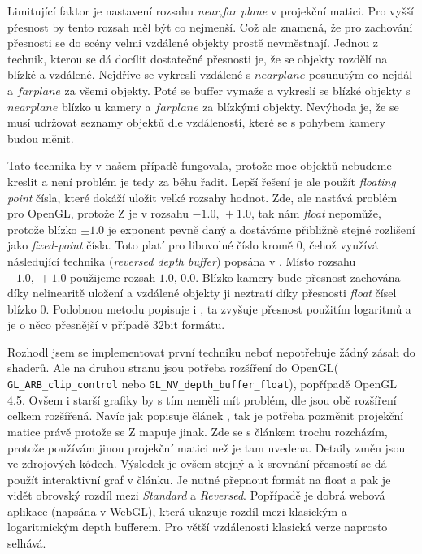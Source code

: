 Limitující faktor je nastavení rozsahu \textit{near,far plane} v projekční matici. Pro vyšší přesnost by tento rozsah měl být co nejmenší. Což ale znamená, že pro zachování přesnosti se do scény velmi vzdálené objekty prostě nevměstnají. Jednou z technik, kterou se dá docílit dostatečné přesnosti je, že se objekty rozdělí na blízké a vzdálené. Nejdříve se vykreslí vzdálené s $ near plane $ posunutým co nejdál a $ far plane $ za všemi objekty. Poté se buffer vymaže a vykreslí se blízké objekty s $ near plane $ blízko u kamery a $ far plane $ za blízkými objekty. Nevýhoda je, že se musí udržovat seznamy objektů dle vzdáleností, které se s pohybem kamery budou měnit. 

Tato technika by v našem případě fungovala, protože moc objektů nebudeme kreslit a není problém je tedy za běhu řadit. Lepší řešení je ale použít \textit{floating point} čísla, které dokáží uložit velké rozsahy hodnot. Zde, ale nastává problém pro OpenGL, protože Z je v rozsahu $ -1.0,\,+1.0 $, tak nám \textit{float} nepomůže, protože blízko $ \pm1.0 $ je exponent pevně daný a dostáváme přibližně stejné rozlišení jako \textit{fixed-point} čísla. Toto platí pro libovolné číslo kromě 0, čehož využívá následující technika (\textit{reversed depth buffer}) popsána v \cite{revBuff}. Místo rozsahu $ -1.0,\,+1.0 $ použijeme rozsah  $ 1.0,\,0.0  $. Blízko kamery bude přesnost zachována díky nelinearitě uložení a vzdálené objekty ji neztratí díky přesnosti \textit{float} čísel blízko 0. Podobnou metodu popisuje i \cite{logBuff}, ta zvyšuje přesnost použitím logaritmů a je o něco přesnější v případě 32bit formátu.

Rozhodl jsem se implementovat první techniku neboť nepotřebuje žádný zásah do shaderů. Ale na druhou stranu jsou potřeba rozšíření do OpenGL( \texttt{GL\_ARB\_clip\_control} nebo \texttt{GL\_NV\_depth\_buffer\_float}), popřípadě OpenGL 4.5. Ovšem i starší grafiky by s tím neměli mít problém, dle \cite{GLEXT} jsou obě rozšíření celkem rozšířená. Navíc jak popisuje článek \cite{revBuff}, tak je potřeba pozměnit projekční matice právě protože se Z mapuje jinak. Zde se s článkem trochu rozcházím, protože používám jinou projekční matici než je tam uvedena. Detaily změn jsou ve zdrojových kódech. Výsledek je ovšem stejný a k srovnání přesností se dá použít interaktivní graf v článku. Je nutné přepnout formát na float a pak je vidět obrovský rozdíl mezi \textit{Standard} a \textit{Reversed}. Popřípadě je dobrá webová aplikace \cite{srovnaniBuffer}(napsána v WebGL), která ukazuje rozdíl mezi klasickým a logaritmickým depth bufferem. Pro větší vzdálenosti klasická verze naprosto selhává.

